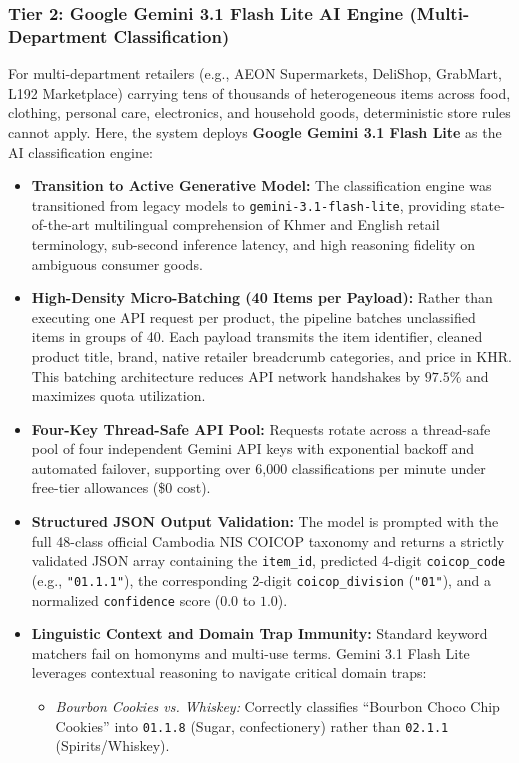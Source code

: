 \subsubsection{Tier 2: Google Gemini 3.1 Flash Lite AI Engine (Multi-Department Classification)}
\hs For multi-department retailers (e.g., AEON Supermarkets, DeliShop, GrabMart, L192 Marketplace) carrying tens of thousands of heterogeneous items across food, clothing, personal care, electronics, and household goods, deterministic store rules cannot apply. Here, the system deploys \textbf{Google Gemini 3.1 Flash Lite} as the AI classification engine:
\begin{itemize}
    \item \textbf{Transition to Active Generative Model:} The classification engine was transitioned from legacy models to \texttt{gemini-3.1-flash-lite}, providing state-of-the-art multilingual comprehension of Khmer and English retail terminology, sub-second inference latency, and high reasoning fidelity on ambiguous consumer goods.
    \item \textbf{High-Density Micro-Batching (40 Items per Payload):} Rather than executing one API request per product, the pipeline batches unclassified items in groups of 40. Each payload transmits the item identifier, cleaned product title, brand, native retailer breadcrumb categories, and price in KHR. This batching architecture reduces API network handshakes by $97.5\%$ and maximizes quota utilization.
    \item \textbf{Four-Key Thread-Safe API Pool:} Requests rotate across a thread-safe pool of four independent Gemini API keys with exponential backoff and automated failover, supporting over 6,000 classifications per minute under free-tier allowances (\$0 cost).
    \item \textbf{Structured JSON Output Validation:} The model is prompted with the full 48-class official Cambodia NIS COICOP taxonomy and returns a strictly validated JSON array containing the \texttt{item\_id}, predicted 4-digit \texttt{coicop\_code} (e.g., \texttt{"01.1.1"}), the corresponding 2-digit \texttt{coicop\_division} (\texttt{"01"}), and a normalized \texttt{confidence} score ($0.0$ to $1.0$).
    \item \textbf{Linguistic Context and Domain Trap Immunity:} Standard keyword matchers fail on homonyms and multi-use terms. Gemini 3.1 Flash Lite leverages contextual reasoning to navigate critical domain traps:
    \begin{itemize}[noitemsep]
        \item \textit{Bourbon Cookies vs. Whiskey:} Correctly classifies ``Bourbon Choco Chip Cookies'' into \texttt{01.1.8} (Sugar, confectionery) rather than \texttt{02.1.1} (Spirits/Whiskey).

\end{itemize}
\end{itemize}
